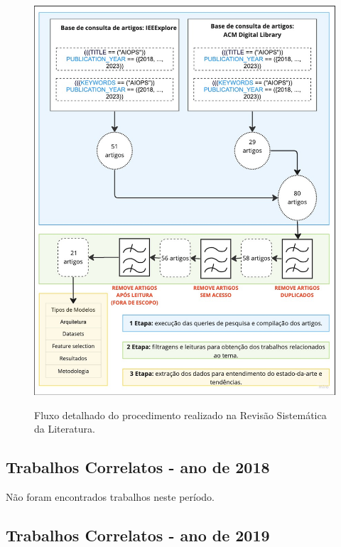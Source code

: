 \begin{figure}[H]
\centering
\caption{Fluxo detalhado do procedimento realizado na Revisão Sistemática da Literatura. } \includegraphics[width=\textwidth,keepaspectratio]{2-images/Fluxograma-papers.png}
\newline {}\label{fig:diagrama_detalhado_rev_sistematica}
\end{figure}    
    
    

\subsection{Trabalhos Correlatos - ano de 2018}\label{trab_correlatos_18}
Não foram encontrados trabalhos neste período.

\subsection{Trabalhos Correlatos - ano de 2019}\label{trab_correlatos_19}

